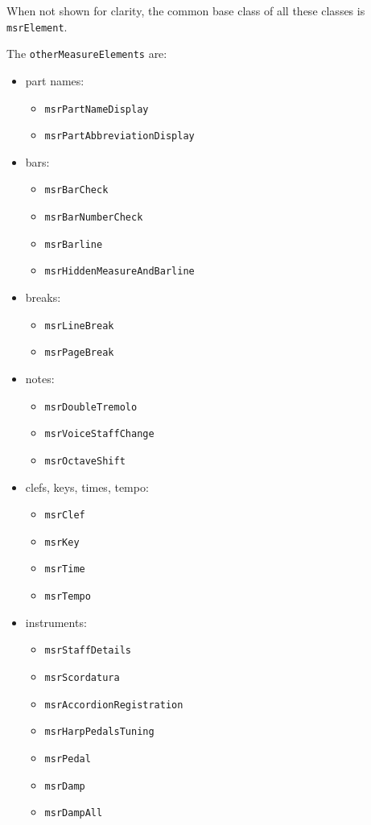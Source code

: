 \documentclass[12pt,a4paper]{article}
\begin{document}
When not shown for clarity, the common base class of all these classes is {\tt msrElement}.

The {\tt otherMeasureElements} are: 

\begin{itemize}
\item part names:
  \begin{itemize}
  \item {\tt msrPartNameDisplay}
  \item {\tt msrPartAbbreviationDisplay}
  \end{itemize}

\item bars:
  \begin{itemize}
  \item {\tt msrBarCheck}
  \item {\tt msrBarNumberCheck}
  \item {\tt msrBarline}
  \item {\tt msrHiddenMeasureAndBarline}
  \end{itemize}

\item breaks:
  \begin{itemize}
  \item {\tt msrLineBreak}
  \item {\tt msrPageBreak}
  \end{itemize}

\item notes:
  \begin{itemize}
  \item {\tt msrDoubleTremolo}
  \item {\tt msrVoiceStaffChange}
  \item {\tt msrOctaveShift}
  \end{itemize}

\item clefs, keys, times, tempo:
  \begin{itemize}
  \item {\tt msrClef}
  \item {\tt msrKey}
  \item {\tt msrTime}
  \item {\tt msrTempo}
  \end{itemize}

\item instruments:
  \begin{itemize}
  \item {\tt msrStaffDetails}
  \item {\tt msrScordatura}
  \item {\tt msrAccordionRegistration}
  \item {\tt msrHarpPedalsTuning}
  \item {\tt msrPedal}
  \item {\tt msrDamp}
  \item {\tt msrDampAll}
  \end{itemize}


\end{itemize}
\end{document}
